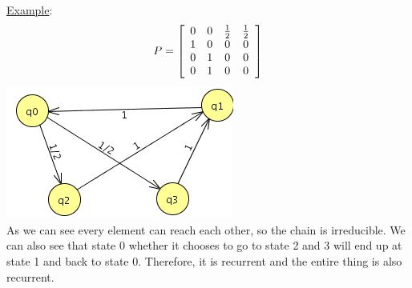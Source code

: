   \noindent\underline{Example}:
  $$
    P = \left[
      \begin{array}{c c c c}
        0 & 0 & \frac{1}{2} & \frac{1}{2}\\
        1 & 0 & 0 & 0\\
        0 & 1 & 0 & 0\\
        0 & 1 & 0 & 0\\
      \end{array}
      \right]
  $$
  \includegraphics{Ex1_4_27.png}\\
  As we can see every element can reach each other, so the chain is 
  irreducible. We can also see that state 0 whether it chooses to
  go to state 2 and 3 will end up at state 1 and back to state 0.
  Therefore, it is recurrent and the entire thing is also recurrent.\\

